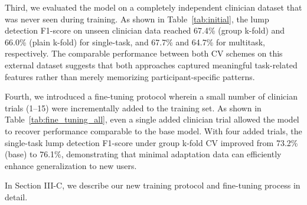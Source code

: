 \documentclass[a4paper, onecolumn]{IEEEtran}
\begin{document}
Third, we evaluated the model on a completely independent clinician dataset that was never seen during training. As shown in Table~\ref{tab:initial}, the lump detection F1-score on unseen clinician data reached 67.4\% (group k-fold) and 66.0\% (plain k-fold) for single-task, and 67.7\% and 64.7\% for multitask, respectively. The comparable performance between both CV schemes on this external dataset suggests that both approaches captured meaningful task-related features rather than merely memorizing participant-specific patterns.

Fourth, we introduced a fine-tuning protocol wherein a small number of clinician trials (1--15) were incrementally added to the training set. As shown in Table~\ref{tab:fine_tuning_all}, even a single added clinician trial allowed the model to recover performance comparable to the base model. With four added trials, the single-task lump detection F1-score under group k-fold CV improved from 73.2\% (base) to 76.1\%, demonstrating that minimal adaptation data can efficiently enhance generalization to new users.

In Section III-C, we describe our new training protocol and fine-tuning process in detail.
\end{document}
